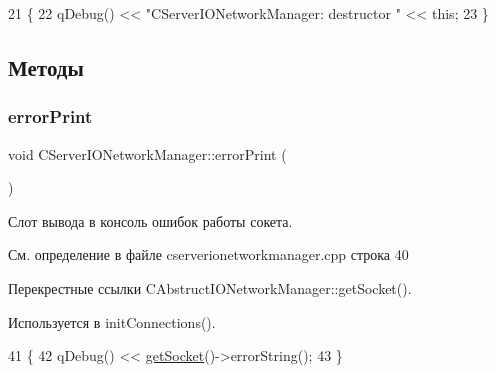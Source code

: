 \begin{DoxyCode}
21 \{
22     qDebug() << \textcolor{stringliteral}{"CServerIONetworkManager: destructor "} << \textcolor{keyword}{this};
23 \}
\end{DoxyCode}


\subsection{Методы}
\hypertarget{class_c_server_i_o_network_manager_a27831f1d8f66c1e0d665c2ef52d262e4}{}\label{class_c_server_i_o_network_manager_a27831f1d8f66c1e0d665c2ef52d262e4} 
\subsubsection{\texorpdfstring{error\+Print}{errorPrint}}
{\footnotesize\ttfamily void C\+Server\+I\+O\+Network\+Manager\+::error\+Print (\begin{DoxyParamCaption}\item[{Q\+Abstract\+Socket\+::\+Socket\+Error}]{ }\end{DoxyParamCaption})\hspace{0.3cm}{\ttfamily [slot]}}



Слот вывода в консоль ошибок работы сокета. 



См. определение в файле cserverionetworkmanager.\+cpp строка 40



Перекрестные ссылки C\+Abstruct\+I\+O\+Network\+Manager\+::get\+Socket().



Используется в init\+Connections().


\begin{DoxyCode}
41 \{
42     qDebug() << \hyperlink{class_c_abstruct_i_o_network_manager_a118a2c8254c149614cba51c42147c709}{getSocket}()->errorString();
43 \}
\end{DoxyCode}
\hypertarget{class_c_server_i_o_network_manager_a17155570c51dc951db52d827f120c689}{}\label{class_c_server_i_o_network_manager_a17155570c51dc951db52d827f120c689} 
